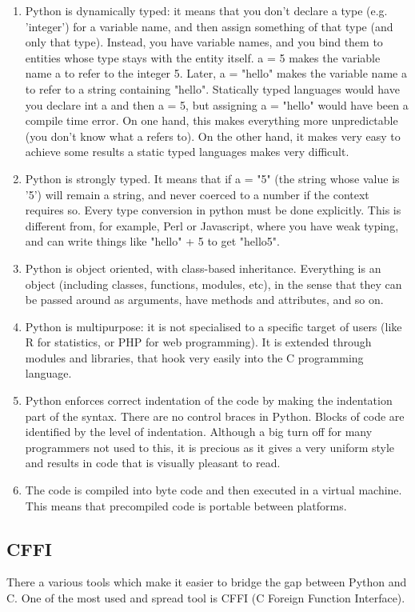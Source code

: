         \begin{enumerate}
           \item Python is dynamically typed: it means that you don't declare a type (e.g. 'integer') for a variable name, and then assign something of that type (and only that type). Instead, you have variable names, and you bind them to entities whose type stays with the entity itself. a = 5 makes the variable name a to refer to the integer 5. Later, a = "hello" makes the variable name a to refer to a string containing "hello". Statically typed languages would have you declare int a and then a = 5, but assigning a = "hello" would have been a compile time error. On one hand, this makes everything more unpredictable (you don't know what a refers to). On the other hand, it makes very easy to achieve some results a static typed languages makes very difficult.
           \item Python is strongly typed. It means that if a = "5" (the string whose value is '5') will remain a string, and never coerced to a number if the context requires so. Every type conversion in python must be done explicitly. This is different from, for example, Perl or Javascript, where you have weak typing, and can write things like "hello" + 5 to get "hello5".
           \item Python is object oriented, with class-based inheritance. Everything is an object (including classes, functions, modules, etc), in the sense that they can be passed around as arguments, have methods and attributes, and so on.
           \item Python is multipurpose: it is not specialised to a specific target of users (like R for statistics, or PHP for web programming). It is extended through modules and libraries, that hook very easily into the C programming language.
           \item Python enforces correct indentation of the code by making the indentation part of the syntax. There are no control braces in Python. Blocks of code are identified by the level of indentation. Although a big turn off for many programmers not used to this, it is precious as it gives a very uniform style and results in code that is visually pleasant to read.
           \item The code is compiled into byte code and then executed in a virtual machine. This means that precompiled code is portable between platforms.
        \end{enumerate}
        
    \subsection{CFFI}
        There a various tools which make it easier to bridge the gap between Python and C. One of the most used and spread tool is CFFI (C Foreign Function Interface).
        

